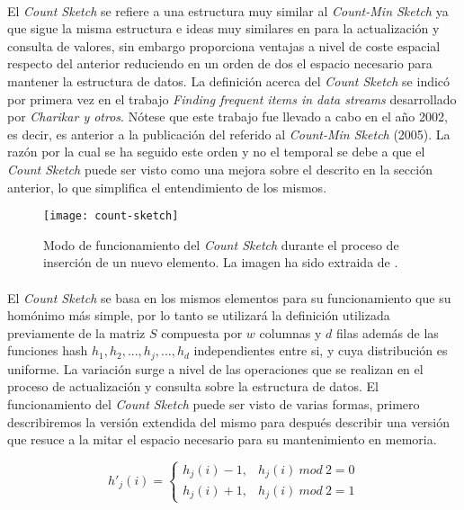 \documentclass{subfiles}
\begin{document}
      \paragraph{}
      El \emph{Count Sketch} se refiere a una estructura muy similar al \emph{Count-Min Sketch} ya que sigue la misma estructura e ideas muy similares en para la actualización y consulta de valores, sin embargo proporciona ventajas a nivel de coste espacial respecto del anterior reduciendo en un orden de dos el espacio necesario para mantener la estructura de datos. La definición acerca del \emph{Count Sketch} se indicó por primera vez en el trabajo \emph{Finding frequent items in data streams} \cite{charikar2002finding} desarrollado por \emph{Charikar y otros}. Nótese que este trabajo fue llevado a cabo en el año 2002, es decir, es anterior a la publicación del referido al \emph{Count-Min Sketch} (2005). La razón por la cual se ha seguido este orden y no el temporal se debe a que el \emph{Count Sketch} puede ser visto como una mejora sobre el descrito en la sección anterior, lo que simplifica el entendimiento de los mismos.

      \begin{figure}
        \centering
        \texttt{[image: count-sketch]}
        \caption{Modo de funcionamiento del \emph{Count Sketch} durante el proceso de inserción de un nuevo elemento. La imagen ha sido extraida de \cite{cormode2012synopses}.}
        \label{fig:count_sketch}
      \end{figure}

      \paragraph{}
      El \emph{Count Sketch} se basa en los mismos elementos para su funcionamiento que su homónimo más simple, por lo tanto se utilizará la definición utilizada previamente de la matriz $S$ compuesta por $w$ columnas y $d$ filas además de las funciones hash $h_1, h_2, ..., h_j,..., h_d$ independientes entre si, y cuya distribución es uniforme. La variación surge a nivel de las operaciones que se realizan en el proceso de actualización y consulta sobre la estructura de datos. El funcionamiento del \emph{Count Sketch} puede ser visto de varias formas, primero describiremos la versión extendida del mismo para después describir una versión que resuce a la mitar el espacio necesario para su mantenimiento en memoria.

      \begin{equation}
      \label{eq:count_sketch_hash_2}
        h'_j(i) =
          \begin{cases}
            h_j(i) - 1, & h_j(i) \ mod \ 2 = 0\\
            h_j(i) + 1, & h_j(i) \ mod \ 2 = 1
          \end{cases}
      \end{equation}
\end{document}
